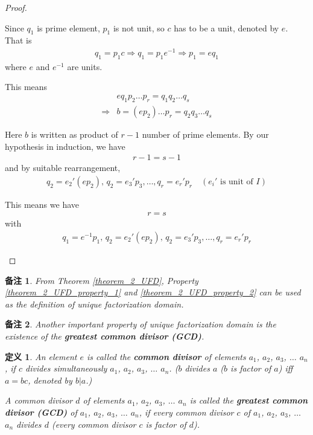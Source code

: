 \documentclass[utf8]{ctexbook}
\newtheorem{definition}{定义}[section]
\newtheorem{memo}{备注}[section]
\begin{document}
\begin{proof}
\begin{itemize}
{Since $q_1$ is prime element, $p_1$ is not unit, so $c$ has to be a unit, denoted by $e$. That is
\begin{align*}
q_1 = p_1 c \Longrightarrow q_1 = p_1 e^{-1}  \Longrightarrow p_1 = e q_1 
\end{align*}
where $e$ and $e^{-1}$ are units.   

This means
\begin{align*}
& e q_1 p_2 \ldots p_r = q_1 q_2 \ldots q_s \\
\Longrightarrow & b = (e p_2) \ldots p_r = q_2 q_3 \ldots q_s
\end{align*}

Here $b$ is written as product of $ r - 1 $ number of prime elements. By our hypothesis in induction, we have 
\begin{align*}
r-1 = s -1 
\end{align*}
and by suitable rearrangement,
\begin{align*}
q_2 =e_2 ' (e p_2),\, q_2 = e_3 ' p_3, \ldots, q_r = e_r ' p_r \quad (e_i ' \mbox{ is unit of } I)
\end{align*}

This means we have
\begin{align*}
r = s
\end{align*}
with
\begin{align*}
q_1 = e^{-1} p_1, \, q_2 =e_2 ' (e p_2),\, q_2 = e_3 ' p_3, \ldots, q_r = e_r ' p_r 
\end{align*}
}
\end{itemize} 

\end{proof}


\begin{memo}
From Theorem \ref{theorem_2_UFD}, Property \ref{theorem_2_UFD_property_1} and \ref{theorem_2_UFD_property_2} can be used as the definition of unique factorization domain.
\end{memo}

\begin{memo}
Another important property of unique factorization domain is the existence of the \textbf{greatest common divisor (GCD)}. 
\end{memo}


\begin{definition}
\label{def_UDF_GCD}
An element $e$ is called the \textbf{common divisor} of elements $a_1$, $a_2$, $a_3$, $\ldots$ $a_n$, if $c$ divides simultaneously $a_1$, $a_2$, $a_3$, $\ldots$ $a_n$. ($b$ divides $a$ ($b$ is factor of $a$) iff $a = bc$, denoted by $b | a$.)

A common divisor $d$ of elements $a_1$, $a_2$, $a_3$, $\ldots$ $a_n$ is called the \textbf{greatest common divisor (GCD)} of $a_1$, $a_2$, $a_3$, $\ldots$ $a_n$, if every common divisor $c$ of 
$a_1$, $a_2$, $a_3$, $\ldots$ $a_n$ divides $d$ (every common divisor $c$ is factor of $d$).
\end{definition}
\end{document}
